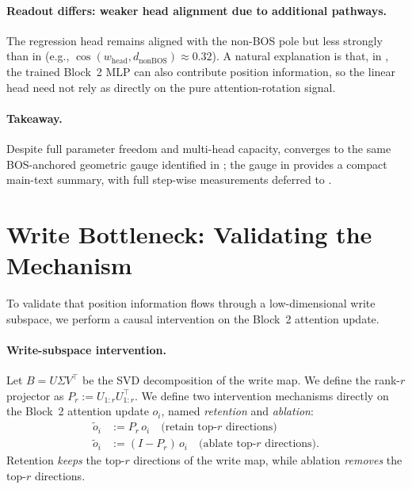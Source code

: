 \documentclass{article}
\theoremstyle{plain}
\theoremstyle{definition}
\theoremstyle{remark}
\begin{document}
\paragraph{Readout differs: weaker head alignment due to additional pathways.}
The regression head remains aligned with the non-BOS pole but less strongly than in \modelminimal
(e.g., $\cos(w_{\text{head}},d_{\text{nonBOS}})\approx 0.32$).
A natural explanation is that, in \modelfull, the trained Block~2 MLP can also contribute position information, so the
linear head need not rely as directly on the pure attention-rotation signal.

\paragraph{Takeaway.}
Despite full parameter freedom and multi-head capacity, \modelfull converges to the same BOS-anchored geometric gauge
identified in \modelminimal; the gauge in  provides a compact main-text summary, with full step-wise
measurements deferred to .


\section{Write Bottleneck: Validating the Mechanism}
\label{sec:write_bottleneck}
To validate that position information flows through a low-dimensional write subspace,
we perform a causal intervention on the Block~2 attention update.
\paragraph{Write-subspace intervention.}
Let $B = U\Sigma V^\top$ be the SVD decomposition of the write map.
We define the rank-$r$ projector as $P_r := U_{1:r}U_{1:r}^\top$.
We define two intervention mechanisms directly on the Block~2 attention update $o_i$, named \textit{retention} and \textit{ablation}:
\begin{align}
\tilde o_i &:= P_r\, o_i \quad \text{(retain top-$r$ directions)} \\
\tilde o_i &:= (I-P_r)\, o_i \quad \text{(ablate top-$r$ directions)}.
\end{align}
Retention \textit{keeps} the top-$r$ directions of the write map, while ablation \textit{removes} the top-$r$ directions.
\end{document}
